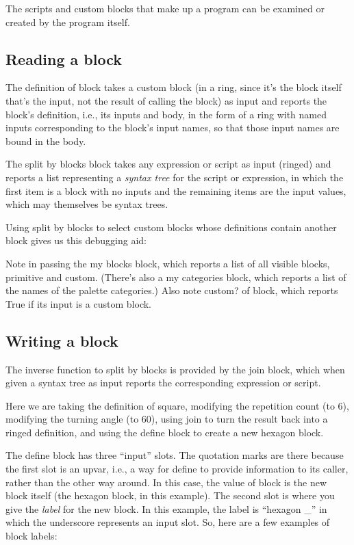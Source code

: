 The scripts and custom blocks that make up a program can be examined or
created by the program itself.

\subsection{Reading a block}\label{reading-a-block}

The definition of block takes a custom block (in a ring, since it's the
block itself that's the input, not the result of calling the block) as
input and reports the block's definition, i.e., its inputs and body, in
the form of a ring with named inputs corresponding to the block's input
names, so that those input names are bound in the body.

The split by blocks block takes any expression or script as input
(ringed) and reports a list representing a \emph{syntax tree} for the
script or expression, in which the first item is a block with no inputs
and the remaining items are the input values, which may themselves be
syntax trees.

Using split by blocks to select custom blocks whose definitions contain
another block gives us this debugging aid:

Note in passing the my blocks block, which reports a list of all visible
blocks, primitive and custom. (There's also a my categories block, which
reports a list of the names of the palette categories.) Also note
custom? of block, which reports True if its input is a custom block.

\subsection{Writing a block}\label{writing-a-block}

The inverse function to split by blocks is provided by the join block,
which when given a syntax tree as input reports the corresponding
expression or script.

Here we are taking the definition of square, modifying the repetition
count (to 6), modifying the turning angle (to 60), using join to turn
the result back into a ringed definition, and using the define block to
create a new hexagon block.

The define block has three ``input'' slots. The quotation marks are
there because the first slot is an upvar, i.e., a way for define to
provide information to its caller, rather than the other way around. In
this case, the value of block is the new block itself (the hexagon
block, in this example). The second slot is where you give the
\emph{label} for the new block. In this example, the label is ``hexagon
\_'' in which the underscore represents an input slot. So, here are a
few examples of block labels:

